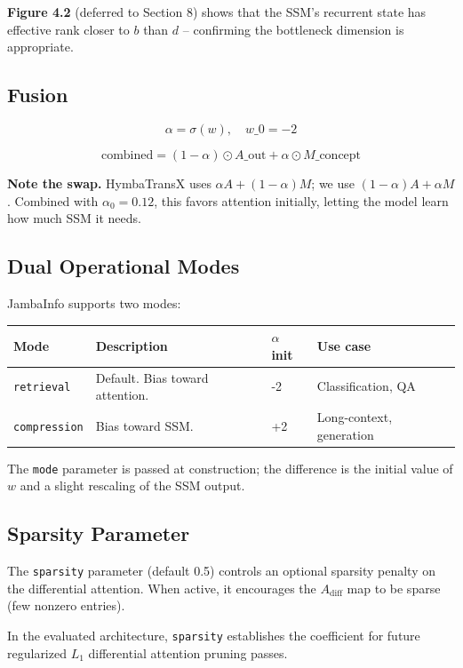 \textbf{Figure 4.2} (deferred to Section 8) shows that the SSM's recurrent 
state has effective rank closer to $b$ than $d$ -- confirming the 
bottleneck dimension is appropriate.

\subsection{Fusion}

\[
\alpha = \sigma(w), \quad w\_0 = -2
\tag{4.9}
\]

\[
\text{combined} = (1 - \alpha) \odot A\_\text{out} + \alpha \odot M\_\text{concept}
\tag{4.10}
\]

\textbf{Note the swap.} HymbaTransX uses $\alpha A + (1-\alpha) M$; we use 
$(1-\alpha) A + \alpha M$. Combined with $\alpha_0 = 0.12$, this favors 
attention initially, letting the model learn how much SSM it needs.

\subsection{Dual Operational Modes}

JambaInfo supports two modes:

\begin{table}[H]
\centering
\small
\begin{tabular}{llll}
\toprule
\textbf{Mode} & \textbf{Description} & \textbf{$\alpha$ init} & \textbf{Use case} \\
\midrule
\texttt{retrieval} & Default. Bias toward attention. & -2 & Classification, QA \\
\texttt{compression} & Bias toward SSM. & +2 & Long-context, generation \\
\bottomrule
\end{tabular}
\end{table}

The \texttt{mode} parameter is passed at construction; the difference is the 
initial value of $w$ and a slight rescaling of the SSM output.

\subsection{Sparsity Parameter}

The \texttt{sparsity} parameter (default 0.5) controls an optional sparsity 
penalty on the differential attention. When active, it encourages the 
$A_\text{diff}$ map to be sparse (few nonzero entries).

In the evaluated architecture, \texttt{sparsity} establishes the coefficient for future regularized $L_1$ differential attention pruning passes.

